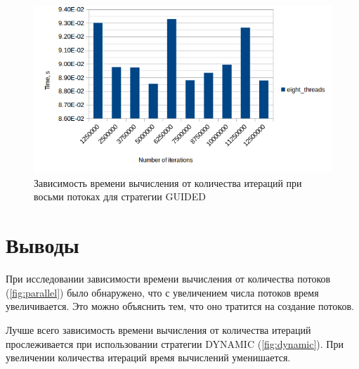 \begin{figure}[h]
  \centering
  \includegraphics[width=.75\textwidth]{guided_m.png}
  \caption{Зависимость времени вычисления от количества итераций при восьми потоках для стратегии GUIDED}
\label{fig:guidedm}
\end{figure}

\chapter*{Выводы}

При исследовании зависимости времени вычисления от количества потоков (\ref{fig:parallel}) было обнаружено, что с увеличением числа потоков время увеличивается. Это можно объяснить тем, что оно тратится на создание потоков.

Лучше всего зависимость времени вычисления от количества итераций прослеживается при использовании стратегии DYNAMIC (\ref{fig:dynamic}). При увеличении количества итераций время вычислений уменишается.




